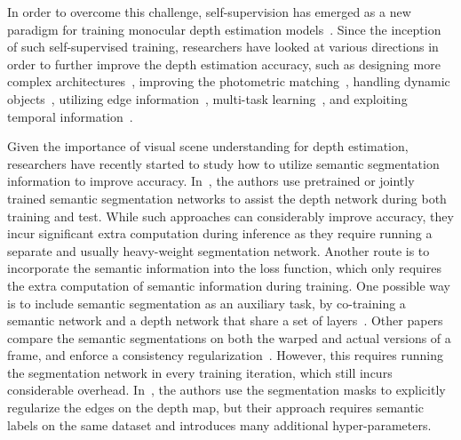 \documentclass{bmvc2k}
\begin{document}
In order to overcome this challenge, self-supervision has emerged as a new paradigm for training monocular depth estimation models~\cite{zhou2017unsupervised, godard2017unsupervised, godard2019digging}. 
Since the inception of such self-supervised training, researchers have looked at various directions in order to further improve the depth estimation accuracy, such as designing more complex architectures~\cite{guizilini20203d, johnston2020self, lyu2020hr}, improving the photometric matching~\cite{shu2020feature, jiang2020dipe}, handling dynamic objects~\cite{casser2019depth, gordon2019depth, dai2020self, klingner2020self}, utilizing edge information~\cite{ramirez2018geometry, zhu2020edge, saeedan2021boosting}, multi-task learning~\cite{yin2018geonet, chen2019self, ranjan2019competitive, luo2019every, tosi2020distilled}, and exploiting temporal information~\cite{patil2020don}. 

Given the importance of visual scene understanding for depth estimation, researchers have recently started to study how to utilize semantic segmentation information to improve accuracy. In~\cite{yue2020semi, guizilini2020semantically, kumar2021syndistnet}, the authors use pretrained or jointly trained semantic segmentation networks to assist the depth network during both training and test. While such approaches can considerably improve accuracy, they incur significant extra computation during inference as they require running a separate and usually heavy-weight segmentation network. Another route is to incorporate the semantic information into the loss function, which only requires the extra computation of semantic information during training. One possible way is to include semantic segmentation as an auxiliary task, by co-training a semantic network and a depth network that share a set of layers~\cite{tosi2020distilled}. Other papers compare the semantic segmentations on both the warped and actual versions of a frame, and enforce a consistency regularization~\cite{yang2018segstereo, chen2019towards}. However, this requires running the segmentation network in every training iteration, which still incurs considerable overhead. In~\cite{zhu2020edge}, the authors use the segmentation masks to explicitly regularize the edges on the depth map, but their approach requires semantic labels on the same dataset and introduces many additional hyper-parameters.  
\end{document}
